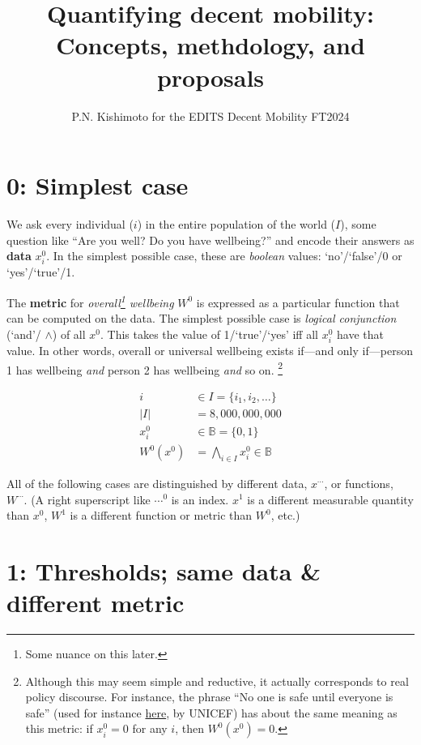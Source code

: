 \documentclass[a5paper,11pt]{article}
\title{Quantifying decent mobility: \\
  Concepts, methdology, and proposals}
\author{P.N. Kishimoto for the EDITS Decent Mobility FT2024}
\begin{document}
\maketitle
\tableofcontents

\section {0: Simplest case}

We ask every individual ($i$) in the entire population of the world ($I$), some question like “Are you well? Do you have wellbeing?” and encode their answers as \textbf{data} $x^0_i$.
In the simplest possible case, these are \emph{boolean} values: ‘no’/‘false’/0 or ‘yes’/‘true’/1.

The \textbf{metric} for \emph{overall\footnote{Some nuance on this later.} wellbeing} $W^0$ is expressed as a particular function that can be computed on the data.
The simplest possible case is \emph{logical conjunction} (‘and’/ $\land$) of all $x^0$.
This takes the value of 1/‘true’/‘yes’ iff all $x^0_i$ have that value.
In other words, overall or universal wellbeing exists if—and only if—person 1 has wellbeing \emph{and} person 2 has wellbeing \emph{and} so on.%
\footnote{Although this may seem simple and reductive, it actually corresponds to real policy discourse.
For instance, the phrase “No one is safe until everyone is safe” (used for instance \href{https://www.unicef.org/press-releases/no-one-safe-until-everyone-safe-why-we-need-global-response-covid-19}{here}, by UNICEF) has about the same meaning as this metric: if $x^0_i=0$ for any $i$, then $W^0(x^0) = 0$.}

\begin{align}
      i & \in I = \{i_1, i_2, \ldots\} \\
    |I| & = 8,000,000,000 \\
  x^0_i & \in \mathbb{B} = \{0, 1\} \\
    W^0(x^0) & = \bigwedge_{i \in I}{x^0_i} \in \mathbb{B} \label{eq:w0}
\end{align}

All of the following cases are distinguished by different data, $x^{\cdots}$, or functions, $W^{\cdots}$.
(A right superscript like $\cdots^0$ is an index.
$x^1$ is a different measurable quantity than $x^0$,
$W^1$ is a different function or metric than $W^0$, etc.)

\section{1: Thresholds; same data \& different metric}
\end{document}
